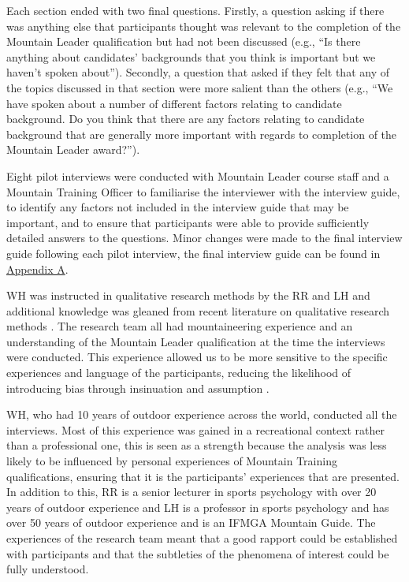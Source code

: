 \documentclass[
  12pt,
  a4paper,
]{book}
\begin{document}
Each section ended with two final questions. Firstly, a question asking if there was anything else that participants thought was relevant to the completion of the Mountain Leader qualification but had not been discussed (e.g., ``Is there anything about candidates' backgrounds that you think is important but we haven't spoken about''). Secondly, a question that asked if they felt that any of the topics discussed in that section were more salient than the others (e.g., ``We have spoken about a number of different factors relating to candidate background. Do you think that there are any factors relating to candidate background that are generally more important with regards to completion of the Mountain Leader award?'').

Eight pilot interviews were conducted with Mountain Leader course staff and a Mountain Training Officer to familiarise the interviewer with the interview guide, to identify any factors not included in the interview guide that may be important, and to ensure that participants were able to provide sufficiently detailed answers to the questions. Minor changes were made to the final interview guide following each pilot interview, the final interview guide can be found in \protect\hyperlink{appendix-interview-guide}{Appendix A}.

WH was instructed in qualitative research methods by the RR and LH and additional knowledge was gleaned from recent literature on qualitative research methods \citep[e.g.,][]{Smith2018a}. The research team all had mountaineering experience and an understanding of the Mountain Leader qualification at the time the interviews were conducted. This experience allowed us to be more sensitive to the specific experiences and language of the participants, reducing the likelihood of introducing bias through insinuation and assumption \citep{Denzin2005}.

WH, who had 10 years of outdoor experience across the world, conducted all the interviews. Most of this experience was gained in a recreational context rather than a professional one, this is seen as a strength because the analysis was less likely to be influenced by personal experiences of Mountain Training qualifications, ensuring that it is the participants' experiences that are presented. In addition to this, RR is a senior lecturer in sports psychology with over 20 years of outdoor experience and LH is a professor in sports psychology and has over 50 years of outdoor experience and is an IFMGA Mountain Guide. The experiences of the research team meant that a good rapport could be established with participants and that the subtleties of the phenomena of interest could be fully understood.
\end{document}
